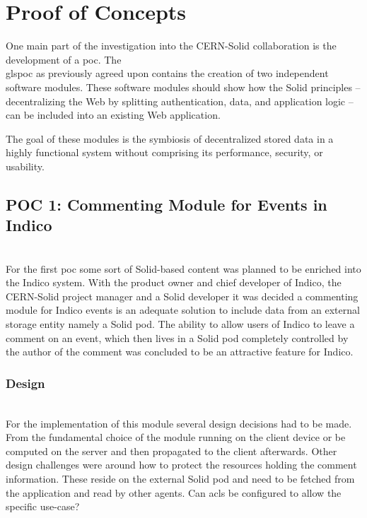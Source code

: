 \section{Proof of Concepts}

One main part of the investigation into the CERN-Solid collaboration is the development of a \gls{poc}. The \\gls{poc} as previously agreed upon contains the creation of two independent software modules. These software modules should show how the Solid principles -- decentralizing the Web by splitting authentication, data, and application logic -- can be included into an existing Web application.

The goal of these modules is the symbiosis of decentralized stored data in a highly functional system without comprising its performance, security, or usability.

\subsection{POC 1: Commenting Module for Events in Indico}\mbox{}\\

For the first \gls{poc} some sort of Solid-based content was planned to be enriched into the Indico system. With the product owner and chief developer of Indico, the CERN-Solid project manager and a Solid developer it was decided a commenting module for Indico events is an adequate solution to include data from an external storage entity namely a Solid pod. The ability to allow users of Indico to leave a comment on an event, which then lives in a Solid pod completely controlled by the author of the comment was concluded to be an attractive feature for Indico.

\subsubsection{Design}\mbox{}\\

For the implementation of this module several design decisions had to be made. From the fundamental choice of the module running on the client device or be computed on the server and then propagated to the client afterwards.
Other design challenges were around how to protect the resources holding the comment information. These reside on the external Solid pod and need to be fetched from the application and read by other agents. Can \glspl{acl} be configured to allow the specific use-case?

